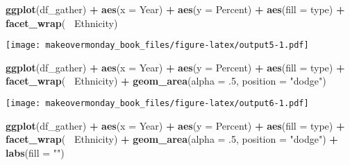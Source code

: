 \documentclass[]{book}
\newenvironment{Shaded}{\begin{snugshade}}{\end{snugshade}}
\newcommand{\KeywordTok}[1]{\textcolor[rgb]{0.13,0.29,0.53}{\textbf{#1}}}
\newcommand{\DataTypeTok}[1]{\textcolor[rgb]{0.13,0.29,0.53}{#1}}
\newcommand{\DecValTok}[1]{\textcolor[rgb]{0.00,0.00,0.81}{#1}}
\newcommand{\StringTok}[1]{\textcolor[rgb]{0.31,0.60,0.02}{#1}}
\newcommand{\OperatorTok}[1]{\textcolor[rgb]{0.81,0.36,0.00}{\textbf{#1}}}
\newcommand{\NormalTok}[1]{#1}
\theoremstyle{definition}
\theoremstyle{definition}
\theoremstyle{definition}
\theoremstyle{remark}
\begin{document}
\clearpage

\begin{Shaded}
\begin{Highlighting}[]
\KeywordTok{ggplot}\NormalTok{(df_gather) }\OperatorTok{+}
\StringTok{  }\KeywordTok{aes}\NormalTok{(}\DataTypeTok{x =}\NormalTok{ Year) }\OperatorTok{+}
\StringTok{  }\KeywordTok{aes}\NormalTok{(}\DataTypeTok{y =}\NormalTok{ Percent) }\OperatorTok{+}
\StringTok{  }\KeywordTok{aes}\NormalTok{(}\DataTypeTok{fill =}\NormalTok{ type) }\OperatorTok{+}
\StringTok{  }\KeywordTok{facet_wrap}\NormalTok{(}\OperatorTok{~}\StringTok{ }\NormalTok{Ethnicity) }
\end{Highlighting}
\end{Shaded}

\texttt{[image: makeovermonday\_book\_files/figure-latex/output5-1.pdf]}

\clearpage

\begin{Shaded}
\begin{Highlighting}[]
\KeywordTok{ggplot}\NormalTok{(df_gather) }\OperatorTok{+}
\StringTok{  }\KeywordTok{aes}\NormalTok{(}\DataTypeTok{x =}\NormalTok{ Year) }\OperatorTok{+}
\StringTok{  }\KeywordTok{aes}\NormalTok{(}\DataTypeTok{y =}\NormalTok{ Percent) }\OperatorTok{+}
\StringTok{  }\KeywordTok{aes}\NormalTok{(}\DataTypeTok{fill =}\NormalTok{ type) }\OperatorTok{+}
\StringTok{  }\KeywordTok{facet_wrap}\NormalTok{(}\OperatorTok{~}\StringTok{ }\NormalTok{Ethnicity) }\OperatorTok{+}
\StringTok{  }\KeywordTok{geom_area}\NormalTok{(}\DataTypeTok{alpha =}\NormalTok{ .}\DecValTok{5}\NormalTok{, }\DataTypeTok{position =} \StringTok{"dodge"}\NormalTok{) }
\end{Highlighting}
\end{Shaded}

\texttt{[image: makeovermonday\_book\_files/figure-latex/output6-1.pdf]}

\clearpage

\begin{Shaded}
\begin{Highlighting}[]
\KeywordTok{ggplot}\NormalTok{(df_gather) }\OperatorTok{+}
\StringTok{  }\KeywordTok{aes}\NormalTok{(}\DataTypeTok{x =}\NormalTok{ Year) }\OperatorTok{+}
\StringTok{  }\KeywordTok{aes}\NormalTok{(}\DataTypeTok{y =}\NormalTok{ Percent) }\OperatorTok{+}
\StringTok{  }\KeywordTok{aes}\NormalTok{(}\DataTypeTok{fill =}\NormalTok{ type) }\OperatorTok{+}
\StringTok{  }\KeywordTok{facet_wrap}\NormalTok{(}\OperatorTok{~}\StringTok{ }\NormalTok{Ethnicity) }\OperatorTok{+}
\StringTok{  }\KeywordTok{geom_area}\NormalTok{(}\DataTypeTok{alpha =}\NormalTok{ .}\DecValTok{5}\NormalTok{, }\DataTypeTok{position =} \StringTok{"dodge"}\NormalTok{) }\OperatorTok{+}
\StringTok{  }\KeywordTok{labs}\NormalTok{(}\DataTypeTok{fill =} \StringTok{""}\NormalTok{) }
\end{Highlighting}
\end{Shaded}
\end{document}

